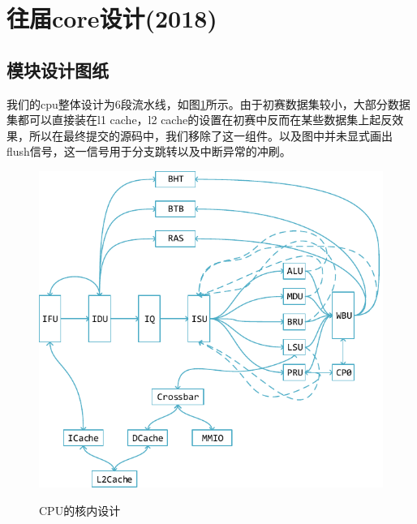 \documentclass[lang=cn,11pt,a4paper]{elegantpaper}
\begin{document}
\section{往届core设计(2018)}

\subsection{模块设计图纸}

我们的cpu整体设计为6段流水线，如图\ref{fig:design_of_core}所示。由于初赛数据集较小，大部分数据集都可以直接装在l1 cache，l2 cache的设置在初赛中反而在某些数据集上起反效果，所以在最终提交的源码中，我们移除了这一组件。以及图中并未显式画出flush信号，这一信号用于分支跳转以及中断异常的冲刷。

\begin{figure}[htbp]
	\centering
	\includegraphics[]{image/core}\\
	\caption{CPU的核内设计}\label{fig:design_of_core}
\end{figure}
\end{document}
